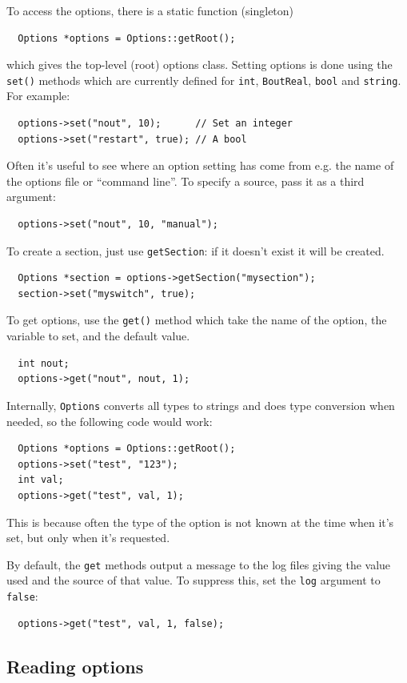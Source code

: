 \documentclass[12pt]{article}
\begin{document}
To access the options, there is a static function (singleton)
\begin{lstlisting}
  Options *options = Options::getRoot();
\end{lstlisting}
which gives the top-level (root) options class. Setting options
is done using the \lstinline!set()! methods which are currently
defined for \lstinline!int!, \lstinline!BoutReal!, \lstinline!bool! and
\lstinline!string!. For example:
\begin{lstlisting}
  options->set("nout", 10);      // Set an integer
  options->set("restart", true); // A bool
\end{lstlisting}
Often it's useful to see where an option setting has come from
e.g. the name of the options file or ``command line''. To specify
a source, pass it as a third argument:
\begin{lstlisting}
  options->set("nout", 10, "manual");
\end{lstlisting}
To create a section, just use \lstinline!getSection!: if it doesn't
exist it will be created.
\begin{lstlisting}
  Options *section = options->getSection("mysection");
  section->set("myswitch", true);
\end{lstlisting}

To get options, use the \lstinline!get()! method which take 
the name of the option, the variable to set, and the default value.
\begin{lstlisting}
  int nout;
  options->get("nout", nout, 1);
\end{lstlisting}
Internally, \lstinline!Options! converts all types to strings
and does type conversion when needed, so the following code would work:
\begin{lstlisting}
  Options *options = Options::getRoot();
  options->set("test", "123");
  int val;
  options->get("test", val, 1);
\end{lstlisting}
This is because often the type of the option is not known
at the time when it's set, but only when it's requested.

By default, the \lstinline!get! methods output a message to
the log files giving the value used and the source of that value.
To suppress this, set the \lstinline!log! argument to \lstinline!false!:
\begin{lstlisting}
  options->get("test", val, 1, false);
\end{lstlisting}

\subsection{Reading options}
\end{document}
